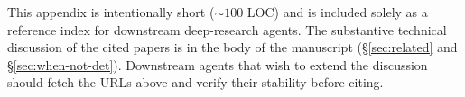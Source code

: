 \begin{remark}
This appendix is intentionally short ($\sim 100$ LOC) and is included
solely as a reference index for downstream deep-research agents. The
substantive technical discussion of the cited papers is in the body
of the manuscript (\S\ref{sec:related} and \S\ref{sec:when-not-det}).
Downstream agents that wish to extend the discussion should fetch
the URLs above and verify their stability before citing.
\end{remark}

